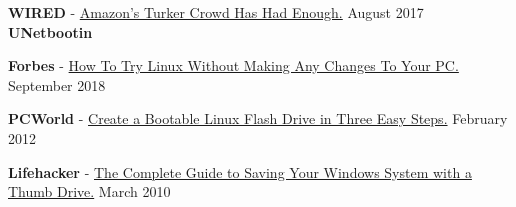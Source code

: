 
\textbf{WIRED} - \href{https://www.wired.com/story/amazons-turker-crowd-has-had-enough/}{Amazon's Turker Crowd Has Had Enough.} \hfill August 2017\\


\textcolor{sectcol}{\textbf{UNetbootin}}

\textbf{Forbes} - \href{https://www.forbes.com/sites/jasonevangelho/2018/09/18/how-to-safely-try-linux-on-your-mac-or-windows-pc/}{How To Try Linux Without Making Any Changes To Your PC.} \hfill September 2018


\textbf{PCWorld} - \href{https://www.pcworld.com/article/249870/create_a_bootable_linux_flash_drive_in_three_easy_steps.html}{Create a Bootable Linux Flash Drive in Three Easy Steps.} \hfill February 2012


\textbf{Lifehacker} - \href{https://lifehacker.com/the-complete-guide-to-saving-your-windows-system-with-a-5504531}{The Complete Guide to Saving Your Windows System with a Thumb Drive.} \hfill March 2010




